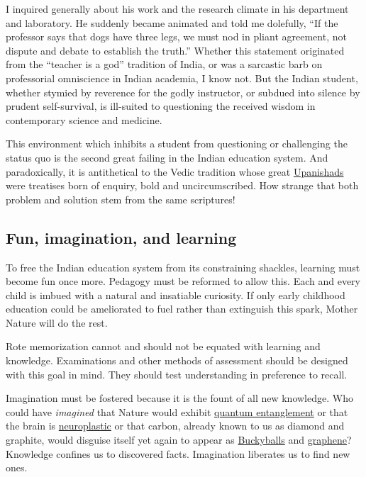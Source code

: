 \documentclass[
  11pt,
  british,
  a4paper,
]{article}
\begin{document}
I inquired generally about his work and the research climate in his
department and laboratory. He suddenly became animated and told me
dolefully, ``If the professor says that dogs have three legs, we must
nod in pliant agreement, not dispute and debate to establish the
truth.'' Whether this statement originated from the ``teacher is a god''
tradition of India, or was a sarcastic barb on professorial omniscience
in Indian academia, I know not. But the Indian student, whether stymied
by reverence for the godly instructor, or subdued into silence by
prudent self-survival, is ill-suited to questioning the received wisdom
in contemporary science and medicine.

This environment which inhibits a student from questioning or
challenging the status quo is the second great failing in the Indian
education system. And paradoxically, it is antithetical to the Vedic
tradition whose great
\href{http://en.wikipedia.org/wiki/Upanishads}{Upanishads} were
treatises born of enquiry, bold and uncircumscribed. How strange that
both problem and solution stem from the same scriptures!

\hypertarget{fun-imagination-and-learning}{%
\subsection{Fun, imagination, and
learning}\label{fun-imagination-and-learning}}

To free the Indian education system from its constraining shackles,
learning must become fun once more. Pedagogy must be reformed to allow
this. Each and every child is imbued with a natural and insatiable
curiosity. If only early childhood education could be ameliorated to
fuel rather than extinguish this spark, Mother Nature will do the rest.

Rote memorization cannot and should not be equated with learning and
knowledge. Examinations and other methods of assessment should be
designed with this goal in mind. They should test understanding in
preference to recall.

Imagination must be fostered because it is the fount of all new
knowledge. Who could have \emph{imagined} that Nature would exhibit
\href{http://www.youtube.com/watch?v=0Eeuqh9QfNI\&list=TLlNpED2t9U9sv5MXb2p3Bdqhg2XFcWnBG}{quantum
entanglement} or that the brain is
\href{http://faculty.washington.edu/chudler/plast.html}{neuroplastic} or
that carbon, already known to us as diamond and graphite, would disguise
itself yet again to appear as
\href{http://en.wikipedia.org/wiki/Bucky_balls}{Buckyballs} and
\href{http://www.graphene.manchester.ac.uk/}{graphene}? Knowledge
confines us to discovered facts. Imagination liberates us to find new
ones.
\end{document}

